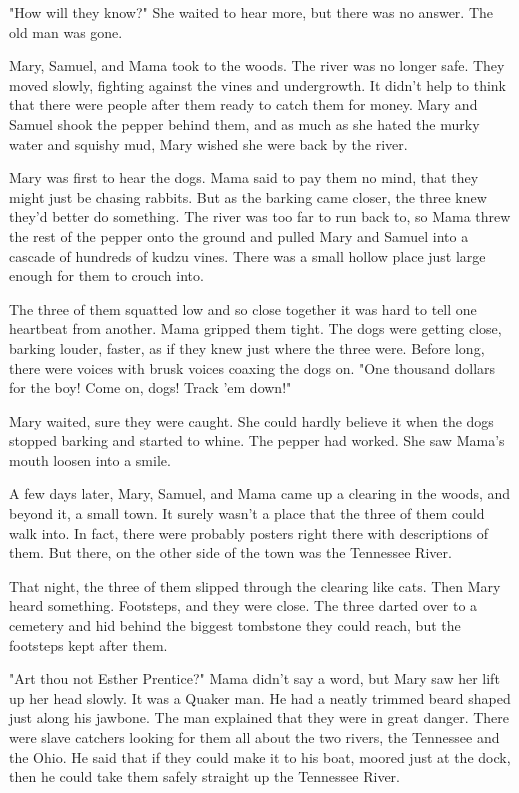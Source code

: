 "How will they know?" She waited to hear more, but there was no answer. The old man was gone.

Mary, Samuel, and Mama took to the woods. The river was no longer safe. They moved slowly, fighting against the vines and undergrowth. It didn't help to think that there were people after them ready to catch them for money. Mary and Samuel shook the pepper behind them, and as much as she hated the murky water and squishy mud, Mary wished she were back by the river.

Mary was first to hear the dogs. Mama said to pay them no mind, that they might just be chasing rabbits. But as the barking came closer, the three knew they'd better do something. The river was too far to run back to, so Mama threw the rest of the pepper onto the ground and pulled Mary and Samuel into a cascade of hundreds of kudzu vines. There was a small hollow place just large enough for them to crouch into.

The three of them squatted low and so close together it was hard to tell one heartbeat from another. Mama gripped them tight. The dogs were getting close, barking louder, faster, as if they knew just where the three were. Before long, there were voices with brusk voices coaxing the dogs on. "One thousand dollars for the boy! Come on, dogs! Track 'em down!"

Mary waited, sure they were caught. She could hardly believe it when the dogs stopped barking and started to whine. The pepper had worked. She saw Mama's mouth loosen into a smile.

A few days later, Mary, Samuel, and Mama came up a clearing in the woods, and beyond it, a small town. It surely wasn't a place that the three of them could walk into. In fact, there were probably posters right there with descriptions of them. But there, on the other side of the town was the Tennessee River.

That night, the three of them slipped through the clearing like cats. Then Mary heard something. Footsteps, and they were close. The three darted over to a cemetery and hid behind the biggest tombstone they could reach, but the footsteps kept after them.

"Art thou not Esther Prentice?" Mama didn't say a word, but Mary saw her lift up her head slowly. It was a Quaker man. He had a neatly trimmed beard shaped just along his jawbone. The man explained that they were in great danger. There were slave catchers looking for them all about the two rivers, the Tennessee and the Ohio. He said that if they could make it to his boat, moored just at the dock, then he could take them safely straight up the Tennessee River.

